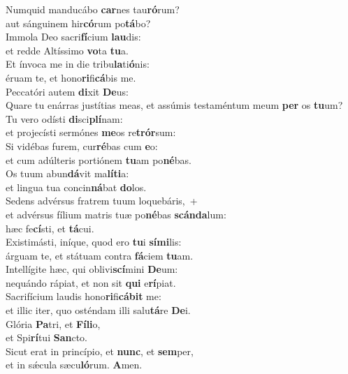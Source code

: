 \evenverse Numquid manducábo \textbf{car}nes tau\textbf{ró}rum?~\*\\
\evenverse aut sánguinem hir\textbf{có}rum po\textbf{tá}bo?\\
\oddverse Immola Deo sacri\textbf{fí}cium \textbf{lau}dis:~\*\\
\oddverse et redde Altíssimo \textbf{vo}ta \textbf{tu}a.\\
\evenverse Et ínvoca me in die tribu\textbf{la}ti\textbf{ó}nis:~\*\\
\evenverse éruam te, et hono\textbf{ri}fi\textbf{cá}bis me.\\
\oddverse Peccatóri autem \textbf{di}xit \textbf{De}us:~\*\\
\oddverse Quare tu enárras justítias meas, et assúmis testaméntum meum \textbf{per} os \textbf{tu}um?\\
\evenverse Tu vero odísti \textbf{di}sci\textbf{plí}nam:~\*\\
\evenverse et projecísti sermónes \textbf{me}os re\textbf{trór}sum:\\
\oddverse Si vidébas furem, cur\textbf{ré}bas cum \textbf{e}o:~\*\\
\oddverse et cum adúlteris portiónem \textbf{tu}am po\textbf{né}bas.\\
\evenverse Os tuum abun\textbf{dá}vit ma\textbf{lí}\textbf{ti}a:~\*\\
\evenverse et lingua tua concin\textbf{ná}bat \textbf{do}los.\\
\oddverse Sedens advérsus fratrem tuum loquebáris,~+\\
\oddverse  et advérsus fílium matris tuæ po\textbf{né}bas \textbf{scán}\textbf{da}lum:~\*\\
\oddverse hæc fe\textbf{cí}sti, et \textbf{tá}cui.\\
\evenverse Existimásti, iníque, quod ero \textbf{tu}i \textbf{sí}\textbf{mi}lis:~\*\\
\evenverse árguam te, et státuam contra \textbf{fá}ciem \textbf{tu}am.\\
\oddverse Intellígite hæc, qui oblivi\textbf{scí}mini \textbf{De}um:~\*\\
\oddverse nequándo rápiat, et non sit \textbf{qui} e\textbf{rí}piat.\\
\evenverse Sacrifícium laudis hono\textbf{ri}fi\textbf{cá}\textbf{bit} me:~\*\\
\evenverse et illic iter, quo osténdam illi salu\textbf{tá}re \textbf{De}i.\\
\oddverse Glória \textbf{Pa}tri, et \textbf{Fí}\textbf{li}o,~\*\\
\oddverse et Spi\textbf{rí}tui \textbf{San}cto.\\
\evenverse Sicut erat in princípio, et \textbf{nunc}, et \textbf{sem}per,~\*\\
\evenverse et in sǽcula sæcu\textbf{ló}rum. \textbf{A}men.\\
